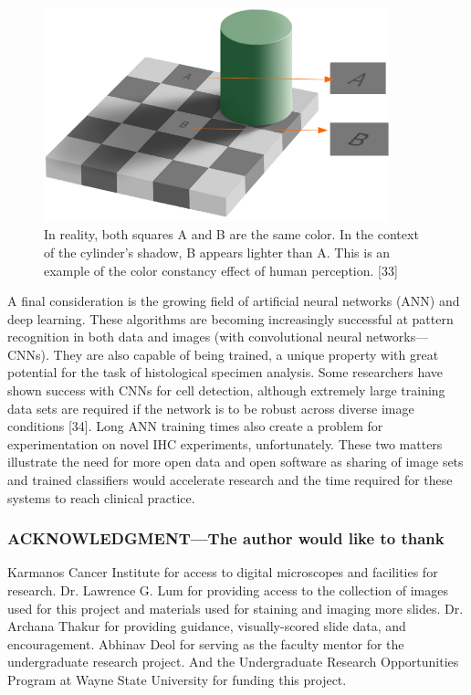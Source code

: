 \documentclass[12pt]{article}
\begin{document}
\begin{figure}[H]
  \centerline{\includegraphics[width=10cm]{13ColorConstancyIllusion.png}}
  \caption{In reality, both squares A and B are the same color. In the context of the cylinder's shadow, B appears lighter than A. This is an example of the color constancy effect of human perception. [33]}
  \label{fig:Color Constancy Illusion}
\end{figure}


A final consideration is the growing field of artificial neural networks (ANN) and deep learning.
These algorithms are becoming increasingly successful at pattern recognition in both data and images
(with convolutional neural networks---CNNs). They are also capable of being trained, a unique
property with great potential for the task of histological specimen analysis. Some researchers have
shown success with CNNs for cell detection, although extremely large training data sets are required if
the network is to be robust across diverse image conditions [34]. Long ANN training times also create a
problem for experimentation on novel IHC experiments, unfortunately. These two matters illustrate the
need for more open data and open software as sharing of image sets and trained classifiers would
accelerate research and the time required for these systems to reach clinical practice.

\newpage
\subsubsection*{ACKNOWLEDGMENT---The author would like to thank}

Karmanos Cancer Institute for access to digital microscopes and facilities for research. Dr. Lawrence
G. Lum for providing access to the collection of images used for this project and materials used for
staining and imaging more slides. Dr. Archana Thakur for providing guidance, visually-scored slide
data, and encouragement. Abhinav Deol for serving as the faculty mentor for the undergraduate
research project. And the Undergraduate Research Opportunities Program at Wayne State University for funding this project.
\end{document}
